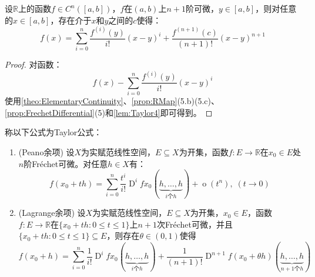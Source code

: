 \begin{lemma}\label{lem:Taylor5}
	设$\mathbb{R}$上的函数$f\in C^n([a,b])$，$f$在$(a,b)$上$n+1$阶可微，$y\in [a,b]$，则对任意的$x\in[a,b]$，存在介于$x$和$y$之间的$c$使得：
	\begin{equation*}
		f(x)=\sum_{i=0}^{n}\frac{f^{(i)}(y)}{i!}(x-y)^i+\frac{f^{(n+1)}(c)}{(n+1)!}(x-y)^{n+1}
	\end{equation*}
\end{lemma}
\begin{proof}
	对函数：
	\begin{equation*}
		f(x)-\sum_{i=0}^{n}\frac{f^{(i)}(y)}{i!}(x-y)^i
	\end{equation*}
	使用\cref{theo:ElementaryContinuity}、\cref{prop:RMap}(5.b)(5.c)、\cref{prop:FrechetDifferential}(5)和\cref{lem:Taylor4}即可得到。
\end{proof}
\begin{theorem}\label{theo:TaylorTheorem}
	称以下公式为Taylor公式：
	\begin{enumerate}
		\item(Peano余项) 设$X$为实赋范线性空间，$E\subseteq X$为开集，函数$f:E\to\mathbb{R}$在$x_0\in E$处$n$阶Fr\'echet可微。对任意$h\in X$有：
		\begin{equation*}
			f(x_0+th)=\sum_{i=0}^{n}\frac{t^i}{i!}\operatorname{D}^ifx_0(\underbrace{h,\dots,h}_{i\text{个}h})+\operatorname{o}(t^n),\;(t\to0)
		\end{equation*}
		\item(Lagrange余项) 设$X$为实赋范线性空间，$E\subseteq X$为开集，$x_0\in E$，函数$f:E\to\mathbb{R}$在$\{x_0+th:0\leqslant t\leqslant1\}$上$n+1$次Fr\'echet可微，并且$\{x_0+th:0\leqslant t\leqslant1\}\subseteq E$，则存在$\theta\in(0,1)$使得
		\begin{equation*}
			f(x_0+h)=\sum_{i=0}^{n}\frac{1}{i!}\operatorname{D}^ifx_0(\underbrace{h,\dots,h}_{i\text{个}h})
			+\frac{1}{(n+1)!}\operatorname{D}^{n+1}f(x_0+\theta h)(\underbrace{h,\dots,h}_{n+1\text{个}h})
		\end{equation*}
	\end{enumerate}
\end{theorem}
